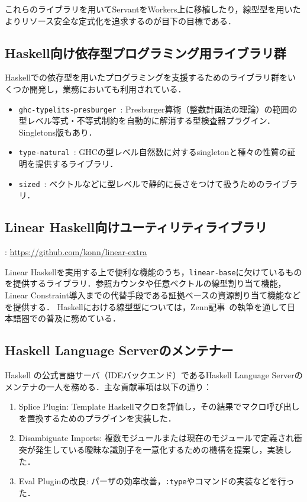 \documentclass[a4j,draft]{ltjsarticle}
\renewcommand{\emph}[1]{\textbf{\textgt{#1}}}
\begin{document}
\begin{refsection}
これらのライブラリを用いてServantをWorkers上に移植したり，線型型を用いたよりリソース安全な定式化を追求するのが目下の目標である．

\subsection*{Haskell向け依存型プログラミング用ライブラリ群}
Haskellでの依存型を用いたプログラミングを支援するためのライブラリ群をいくつか開発し，業務においても利用されている．

\begin{itemize}
  \item \texttt{ghc-typelits-presburger}~\cite{ghc-typelits-presburger}: Presburger算術（整数計画法の理論）の範囲の型レベル等式・不等式制約を自動的に解消する型検査器プラグイン．Singletons版もあり．
  \item \texttt{type-natural}~\cite{type-natural}: GHCの型レベル自然数に対するsingletonと種々の性質の証明を提供するライブラリ．
  \item \texttt{sized}~\cite{sized}: ベクトルなどに型レベルで静的に長さをつけて扱うためのライブラリ．
\end{itemize}

\subsection*{Linear Haskell向けユーティリティライブラリ}
\vspace{-1em}
\noindent
\emph{URL}: \url{https://github.com/konn/linear-extra}
\vspace{1em}

Linear Haskellを実用する上で便利な機能のうち，\texttt{linear-base}に欠けているものを提供するライブラリ．参照カウンタや任意ベクトルの線型割り当て機能，Linear Constraint導入までの代替手段である証拠ベースの資源割り当て機能などを提供する．
Haskellにおける線型型については，Zenn記事~\cite{ISHII:2023lh1,ISHII:2023lh2}の執筆を通して日本語圏での普及に務めている．

\subsection*{Haskell Language Serverのメンテナー}
Haskell の公式言語サーバ（IDEバックエンド）であるHaskell Language Serverのメンテナの一人を務める．主な貢献事項は以下の通り：
  \begin{enumerate}
    \item Splice Plugin: Template Haskellマクロを評価し，その結果でマクロ呼び出しを置換するためのプラグインを実装した．
    \item Disambiguate Imports: 複数モジュールまたは現在のモジュールで定義され衝突が発生している曖昧な識別子を一意化するための機構を提案し，実装した．
    \item Eval Pluginの改良: パーザの効率改善，\texttt{:type}やコマンドの実装などを行った．
  \end{enumerate}


\end{refsection}
\end{document}
